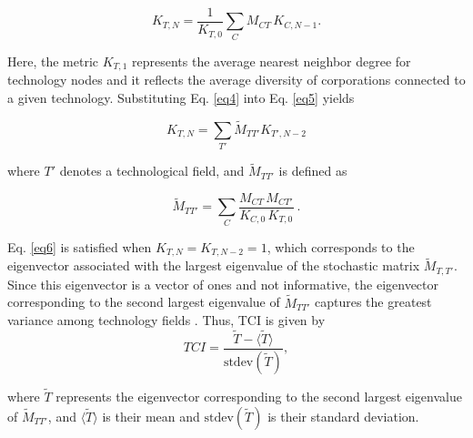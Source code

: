 \documentclass[fleqn,10pt]{wlscirep}
\begin{document}
\begin{equation} \label{eq5}
K_{T,N} = \frac{1}{K_{T,0}} \sum_{C} M_{CT}\, K_{C,N-1}.
\end{equation}

Here, the metric \(K_{T,1}\) represents the average nearest neighbor degree for technology nodes and it reflects the average diversity of corporations connected to a given technology.
Substituting Eq. \ref{eq4} into Eq. \ref{eq5} yields

\begin{equation} \label{eq6}
K_{T,N} = \sum_{T'} \widetilde{M}_{TT'} K_{T',N-2}
\end{equation}

where \(T'\) denotes a technological field, and $\widetilde{M}_{TT'}$ is defined as

\begin{equation} \label{eq7}
\widetilde{M}_{TT'} = \sum_{C} \frac{M_{CT}\, M_{CT'}}{K_{C,0}\, K_{T,0}}~.
\end{equation}

Eq. \ref{eq6} is satisfied when  \(K_{T,N} = K_{T,N-2} = 1\), which corresponds to the eigenvector associated with the largest eigenvalue of the stochastic matrix \(\widetilde{M}_{T,T'}\). 
Since this eigenvector is a vector of ones and not informative, the eigenvector corresponding to the second largest eigenvalue of \(\widetilde{M}_{TT'}\) captures the greatest variance among technology fields \cite{Hidalgo2021, Mealy2019}.
Thus, TCI is given by
\begin{equation} \label{eq8}
TCI = \frac{\widetilde{T} - \langle \widetilde{T} \rangle}{\text{stdev}(\widetilde{T})},
\end{equation}

where \(\widetilde{T}\) represents the eigenvector corresponding to the second largest eigenvalue of \(\widetilde{M}_{TT'}\), and \(\langle \widetilde{T} \rangle\) is their mean and \(\text{stdev}(\widetilde{T})\) is their standard deviation.





\end{document}
